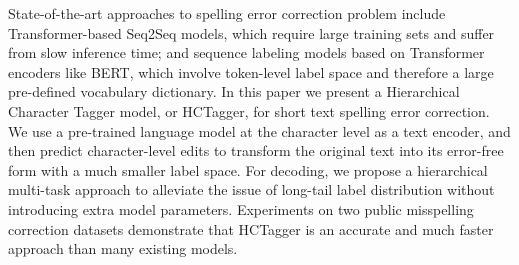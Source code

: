 State-of-the-art approaches to spelling error correction problem include Transformer-based Seq2Seq models, which require large training sets and suffer from slow inference time; and sequence labeling models based on Transformer encoders like BERT, which involve token-level label space and therefore a large pre-defined vocabulary dictionary. In this paper we present a Hierarchical Character Tagger model, or HCTagger, for short text spelling error correction. We use a pre-trained language model at the character level as a text encoder, and then predict character-level edits to transform the original text into its error-free form with a much smaller label space. For decoding, we propose a hierarchical multi-task approach to alleviate the issue of long-tail label distribution without introducing extra model parameters. Experiments on two public misspelling correction datasets demonstrate that HCTagger is an accurate and much faster approach than many existing models.

